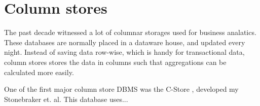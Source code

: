 \section{Column stores}
The past decade witnessed a lot of columnar storages used for business analatics. These databases are normally placed in a dataware house, and updated every night. Instead of saving data row-wise, which is handy for transactional data, column stores stores the data in columns such that aggregations can be calculated more easily.

One of the first major column store DBMS was the C-Store \cite{Stonebraker2005-qz}, developed my Stonebraker et. al. This database uses...
